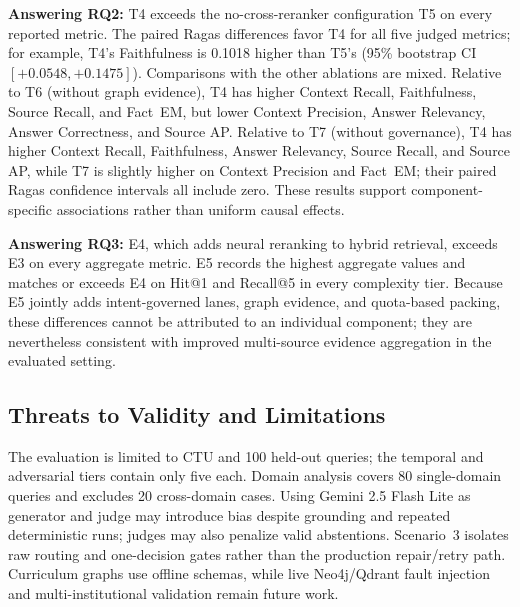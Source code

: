\textbf{Answering RQ2:} T4 exceeds the no-cross-reranker configuration T5 on every reported metric. The paired Ragas differences favor T4 for all five judged metrics; for example, T4's Faithfulness is 0.1018 higher than T5's (95\% bootstrap CI $[+0.0548,+0.1475]$). Comparisons with the other ablations are mixed. Relative to T6 (without graph evidence), T4 has higher Context Recall, Faithfulness, Source Recall, and Fact~EM, but lower Context Precision, Answer Relevancy, Answer Correctness, and Source AP. Relative to T7 (without governance), T4 has higher Context Recall, Faithfulness, Answer Relevancy, Source Recall, and Source AP, while T7 is slightly higher on Context Precision and Fact~EM; their paired Ragas confidence intervals all include zero. These results support component-specific associations rather than uniform causal effects.

\textbf{Answering RQ3:} E4, which adds neural reranking to hybrid retrieval, exceeds E3 on every aggregate metric. E5 records the highest aggregate values and matches or exceeds E4 on Hit@1 and Recall@5 in every complexity tier. Because E5 jointly adds intent-governed lanes, graph evidence, and quota-based packing, these differences cannot be attributed to an individual component; they are nevertheless consistent with improved multi-source evidence aggregation in the evaluated setting.

\subsection{Threats to Validity and Limitations}
\label{sec:limitations}

The evaluation is limited to CTU and 100 held-out queries; the temporal and adversarial tiers contain only five each. Domain analysis covers 80 single-domain queries and excludes 20 cross-domain cases. Using Gemini 2.5 Flash Lite as generator and judge may introduce bias despite grounding and repeated deterministic runs; judges may also penalize valid abstentions. Scenario~3 isolates raw routing and one-decision gates rather than the production repair/retry path. Curriculum graphs use offline schemas, while live Neo4j/Qdrant fault injection and multi-institutional validation remain future work.

